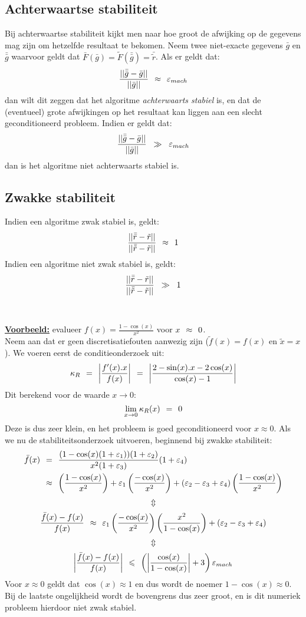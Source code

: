 \documentclass[11pt]{report}
\def \eq {\hspace{1.5mm}=\hspace{1.5mm}}
\def \lesseq {\hspace{1.5mm}\leqslant\hspace{1.5mm}}
\def \appx {\hspace{1.5mm}\approx \hspace{1.5mm}}
\def \h {\hspace{2mm}}
\def \updown {$$\Updownarrow$$}
\begin{document}
	\subsection{Achterwaartse stabiliteit}
		Bij achterwaartse stabiliteit kijkt men naar hoe groot de afwijking op de gegevens mag zijn om hetzelfde resultaat te bekomen. Neem twee niet-exacte gegevens $\bar g$ en $\bar{\bar g}$ waarvoor geldt dat $\bar F(\bar g) = \tilde F(\bar{\bar g}) = \bar{\tilde r}$. Als er geldt dat:
		$$\frac{||\bar{\bar g} - \bar g||}{||\bar g||} \appx \varepsilon_{mach}$$
		dan wilt dit zeggen dat het algoritme \textit{achterwaarts stabiel} is, en dat de (eventueel) grote afwijkingen op het resultaat kan liggen aan een slecht geconditioneerd probleem.
		Indien er geldt dat:
 		$$\frac{||\bar{\bar g} - \bar g||}{||\bar g||} \h\gg \h \varepsilon_{mach}$$
 		dan is het algoritme niet achterwaarts stabiel is.
 	\subsection{Zwakke stabiliteit}
 		Indien een algoritme zwak stabiel is, geldt:
 		$$\frac{||\bar{\bar r} - \tilde r||}{||\bar{\tilde r} - \tilde r||} \appx 1$$
 		Indien een algoritme niet zwak stabiel is, geldt:
 		$$\frac{||\bar{\bar r} - \tilde r||}{||\bar{\tilde r} - \tilde r||} \h\gg\h 1$$
 		\\\\
 		\textbf{\underline{Voorbeeld:}} evalueer $f(x)= \frac{1 - \cos(x)}{x^2}$ voor $x \appx 0$.\\
 		Neem aan dat er geen discretisatiefouten aanwezig zijn ($\tilde f(x) = f(x)$ en $\tilde x = x$). We voeren eerst de conditieonderzoek uit:
 		$$\kappa_R \eq \left|\frac{f'(x) . x}{f(x)} \right| \eq \left|\frac{2 - \sin(x).x - 2\cos(x)}{\cos(x) - 1} \right|$$
 		Dit berekend voor de waarde $x \to 0$:
 		$$\lim_{x \to 0} \kappa_R (x) \eq 0$$
 		Deze is dus zeer klein, en het probleem is goed geconditioneerd voor $x \approx 0$. Als we nu de stabiliteitsonderzoek uitvoeren, beginnend bij zwakke stabiliteit:
 		\begin{align*}
 			\bar f(x) &\eq \frac{(1 - \cos(x)(1 + \varepsilon_1))(1 + \varepsilon_2)}{x^2(1+\varepsilon_3)}(1+\varepsilon_4)\\
 			&\appx \left( \frac{1 - \cos(x)}{x^2}\right) + \varepsilon_1\left(\frac{-\cos(x)}{x^2} \right) + (\varepsilon_2 - \varepsilon_3 + \varepsilon_4)\left(\frac{1 - \cos(x)}{x^2} \right)
 		\end{align*}
 		\updown
 		$$\frac{\bar f(x) - f(x)}{f(x)} \appx \varepsilon_1 \left( \frac{-\cos(x)}{x^2}\right)\left(\frac{x^2}{1 - \cos(x)}\right) + (\varepsilon_2 - \varepsilon_3 + \varepsilon_4)$$
 		\updown
 		$$\left|\frac{\bar f(x) - f(x)}{f(x)} \right| \lesseq \left(\left|\frac{\cos(x)}{1 - \cos(x)}\right| + 3\right)\varepsilon_{mach}$$
 		Voor $x \approx 0$ geldt dat $\cos(x) \approx 1$ en dus wordt de noemer $1 - \cos(x) \approx 0$. Bij de laatste ongelijkheid wordt de bovengrens dus zeer groot, en is dit numeriek probleem hierdoor niet zwak stabiel.
\end{document}
